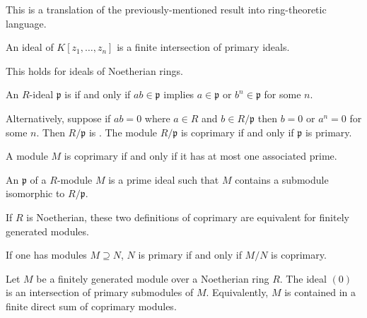 \documentclass [11 pt, oneside] {article}
\begin{document}
This is a translation of the previously-mentioned result into ring-theoretic language.
\begin{theorem}[Lasker]\label{}\index{}
An ideal of $K[z_1,\hdots, z_n]$ is a finite intersection of primary ideals.
\end{theorem}
\begin{theorem}[Noether]\label{}\index{}
This holds for ideals of Noetherian rings.
\end{theorem}

\begin{definition}\label{}
An $R$-ideal $\mathfrak{p}$ is  if and only if $ab\in \mathfrak{p}$ implies $a\in \mathfrak{p}$ or $b^n\in \mathfrak{p}$ for some $n$.
\end{definition}

Alternatively, suppose if $ab=0$ where $a\in R$ and $b\in R/\mathfrak{p}$ then $b=0$ or $a^n=0$ for some $n$. Then $R/\mathfrak{p}$ is . The module $R/\mathfrak{p}$ is coprimary if and only if $\mathfrak{p}$ is primary.

\begin{definition}[ ]\label{}
A module $M$ is coprimary if and only if it has at most one associated prime.
\end{definition}

\begin{definition}[ ]\label{}
An  $\mathfrak{p}$ of a $R$-module $M$ is a prime ideal such that $M$ contains a submodule isomorphic to $R/\mathfrak{p}$.
\end{definition}
\begin{remark}
If $R$ is Noetherian, these two definitions of coprimary are equivalent for finitely generated modules.
\end{remark}

If one has modules $M\supseteq N$, $N$ is primary if and only if $M/N$ is coprimary.

\begin{theorem}\label{}\index{}
Let $M$ be a finitely generated module over a Noetherian ring $R$. The ideal $(0)$ is an intersection of primary submodules of $M$. Equivalently, $M$ is contained in a finite direct sum of coprimary modules.
\end{theorem}
\end{document}
